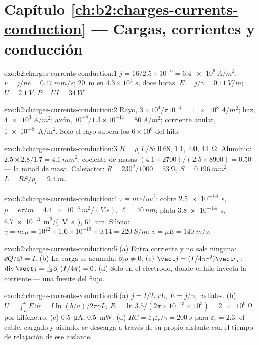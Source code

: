 \section*{Capítulo \ref{ch:b2:charges-currents-conduction} --- Cargas, corrientes y conducción}

\begin{solution}{exo:b2:charges-currents-conduction:1}
$j = 16/2.5 \times 10^{-6} = \qty{6.4e6}{A/m^2}$; $v = j/ne = \qty{0.47}{mm/s}$; \qty{20}{m}
en $4.3 \times 10^4$ s, doce horas. $E = j/\gamma = \qty{0.11}{V/m}$; $U = \qty{2.1}{V}$;
$P = UI = \qty{34}{W}$.
\end{solution}

\begin{solution}{exo:b2:charges-currents-conduction:2}
Rayo, $3 \times 10^4/\pi10^{-4} = \qty{1e8}{A/m^2}$; haz, $\qty{4e3}{A/m^2}$; axón,
$10^{-9}/1.3 \times 10^{-11} = \qty{80}{A/m^2}$; corriente anular, \qty{1e-8}{A/m^2}. Solo el
rayo supera los $6 \times 10^6$ del hilo.
\end{solution}

\begin{solution}{exo:b2:charges-currents-conduction:3}
$R = \rho_eL/S$: $0.68$, $1.1$, $4.0$, \qty{44}{\ohm}. Aluminio: $2.5 \times 2.8/1.7 =
\qty{4.1}{mm^2}$, cociente de masas $(4.1 \times 2700)/(2.5 \times 8900) = 0.50$ --- la mitad de masa.
Calefactor: $R = 230^2/1000 = \qty{53}{\ohm}$, $S = \qty{0.196}{mm^2}$, $L = RS/\rho_e = \qty{9.4}{m}$.
\end{solution}

\begin{solution}{exo:b2:charges-currents-conduction:4}
$\tau = m\gamma/ne^2$: cobre \qty{2.5e-14}{s}, $\mu = e\tau/m = \qty{4.4e-3}{m^2/(V.s)}$,
$\ell = \qty{40}{nm}$; plata \qty{3.8e-14}{s}, \qty{6.7e-3}{m^2/(V.s)}, \qty{61}{nm}.
Silicio: $\gamma = ne\mu = 10^{22} \times 1.6 \times 10^{-19} \times 0.14 = \qty{220}{S/m}$; $v =
\mu E = \qty{140}{m/s}$.
\end{solution}

\begin{solution}{exo:b2:charges-currents-conduction:5}
(a) Entra corriente y no sale ninguna: $\dd Q/\dd t = I$. (b) La carga se acumula: $\partial_t
\rho \ne 0$. (c) $\vect j = (I/4\pi r^2)\vect e_r$: $\operatorname{div}\vect j = \frac1{r^2}
\partial_r(I/4\pi) = 0$. (d) Solo en el electrodo, donde el hilo inyecta la
corriente --- una fuente del flujo.
\end{solution}

\begin{solution}{exo:b2:charges-currents-conduction:6}
(a) $j = I/2\pi rL$, $E = j/\gamma$, radiales. (b) $U = \int_a^bE\,\dd r = I\ln(b/a)/
2\pi\gamma L$: $R = \ln3.5/(2\pi \times 10^{-13} \times 10^3) = \qty{2e9}{\ohm}$ por kilómetro.
(c) \qty{0.5}{\micro A}, \qty{0.5}{mW}. (d) $RC = \varepsilon_0\varepsilon_r/\gamma = \qty{200}{s}$ para
$\varepsilon_r = 2.3$: el cable, cargado y aislado, se descarga a través de su
propio aislante con el tiempo de relajación de ese aislante.
\end{solution}

